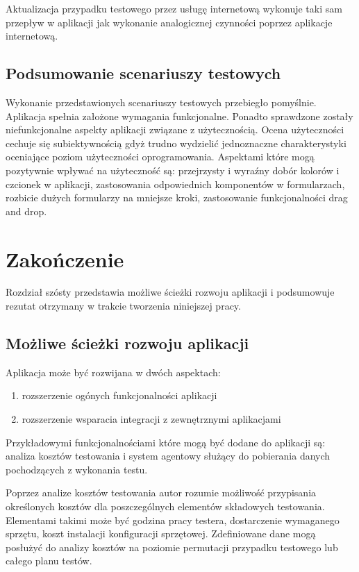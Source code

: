 Aktualizacja przypadku testowego przez usługę internetową wykonuje taki sam przepływ w aplikacji jak wykonanie analogicznej czynności poprzez aplikacje internetową.

\section{Podsumowanie scenariuszy testowych}

Wykonanie przedstawionych scenariuszy testowych przebiegło pomyślnie. Aplikacja spełnia założone wymagania funkcjonalne. Ponadto sprawdzone zostały niefunkcjonalne aspekty aplikacji związane z użytecznością. Ocena użyteczności cechuje się subiektywnością gdyż trudno wydzielić jednoznaczne charakterystyki oceniające poziom użyteczności oprogramowania. Aspektami które mogą pozytywnie wpływać na użyteczność są: przejrzysty i wyraźny dobór kolorów i czcionek w aplikacji, zastosowania odpowiednich komponentów w formularzach, rozbicie dużych formularzy na mniejsze kroki, zastosowanie funkcjonalności drag and drop.



\chapter{Zakończenie}

Rozdział szósty przedstawia możliwe ścieżki rozwoju aplikacji i podsumowuje rezutat otrzymany w trakcie tworzenia niniejszej pracy.

\section{Możliwe ścieżki rozwoju aplikacji}

Aplikacja może być rozwijana w dwóch aspektach:
\begin{enumerate}
  \item rozszerzenie ogónych funkcjonalności aplikacji
  \item rozszerzenie wsparacia integracji z zewnętrznymi aplikacjami
\end{enumerate}

Przykładowymi funkcjonalnościami które mogą być dodane do aplikacji są: analiza kosztów testowania i system agentowy służący do pobierania danych pochodzących z wykonania testu.

Poprzez analize kosztów testowania autor rozumie możliwość przypisania określonych kosztów dla poszczególnych elementów składowych testowania. Elementami takimi może być godzina pracy testera, dostarczenie wymaganego sprzętu, koszt instalacji konfiguracji sprzętowej. Zdefiniowane dane mogą posłużyć do analizy kosztów na poziomie permutacji przypadku testowego lub całego planu testów.

